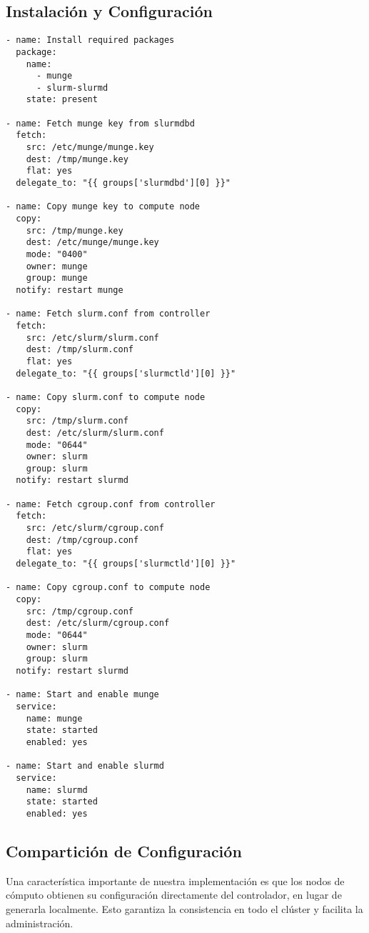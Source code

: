 \documentclass[12pt,a4paper]{article}
\begin{document}
\subsection{Instalación y Configuración}

\begin{lstlisting}[language=ansible, caption=Tareas principales para slurmd]
- name: Install required packages
  package:
    name:
      - munge
      - slurm-slurmd
    state: present

- name: Fetch munge key from slurmdbd
  fetch:
    src: /etc/munge/munge.key
    dest: /tmp/munge.key
    flat: yes
  delegate_to: "{{ groups['slurmdbd'][0] }}"

- name: Copy munge key to compute node
  copy:
    src: /tmp/munge.key
    dest: /etc/munge/munge.key
    mode: "0400"
    owner: munge
    group: munge
  notify: restart munge

- name: Fetch slurm.conf from controller
  fetch:
    src: /etc/slurm/slurm.conf
    dest: /tmp/slurm.conf
    flat: yes
  delegate_to: "{{ groups['slurmctld'][0] }}"

- name: Copy slurm.conf to compute node
  copy:
    src: /tmp/slurm.conf
    dest: /etc/slurm/slurm.conf
    mode: "0644"
    owner: slurm
    group: slurm
  notify: restart slurmd

- name: Fetch cgroup.conf from controller
  fetch:
    src: /etc/slurm/cgroup.conf
    dest: /tmp/cgroup.conf
    flat: yes
  delegate_to: "{{ groups['slurmctld'][0] }}"

- name: Copy cgroup.conf to compute node
  copy:
    src: /tmp/cgroup.conf
    dest: /etc/slurm/cgroup.conf
    mode: "0644"
    owner: slurm
    group: slurm
  notify: restart slurmd

- name: Start and enable munge
  service:
    name: munge
    state: started
    enabled: yes

- name: Start and enable slurmd
  service:
    name: slurmd
    state: started
    enabled: yes
\end{lstlisting}

\subsection{Compartición de Configuración}

Una característica importante de nuestra implementación es que los nodos de cómputo obtienen su configuración directamente del controlador, en lugar de generarla localmente. Esto garantiza la consistencia en todo el clúster y facilita la administración.
\end{document}
